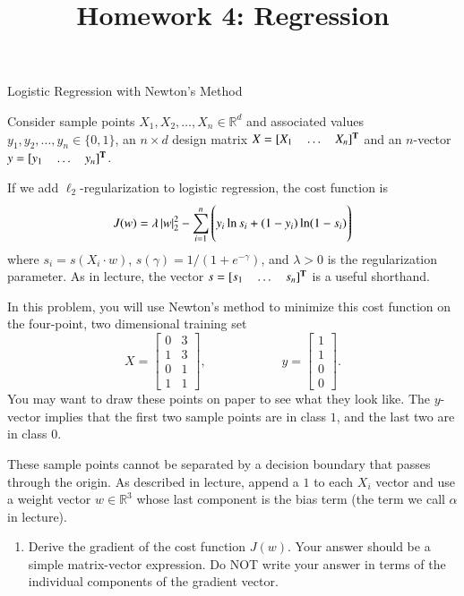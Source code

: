 \documentclass[section]{problemset}
\title{Homework 4: Regression}
\def\1{{\mathbf 1}}
\begin{document}
\newpage


\begin{problem}{Logistic Regression with Newton's Method}

Consider sample points $X_1, X_2, \ldots, X_n \in \mathbb{R}^d$ and
associated values $y_1, y_2, \ldots, y_n \in \{ 0, 1 \}$,
an $n \times d$ design matrix $X = [X_1~~~~\dots~~~~X_n]^{\mathbf{T}}$ and
an $n$-vector $y = [y_1~~~~\dots~~~~y_n]^{\mathbf{T}}$.

If we add $\ell_2$-regularization to logistic regression,
the cost function is
\[
J(w) = \lambda \, |w|^2_2 -
\sum_{i=1}^n \left(y_i \ln s_i + (1-y_i) \ln (1 - s_i) \rule{0pt}{18pt} \right)
\]
where $s_i = s(X_i \cdot w)$, $s(\gamma) = 1 / (1 + e^{- \gamma})$, and
$\lambda > 0$ is the regularization parameter.
As in lecture, the vector $s = [s_1~~~~\dots~~~~s_n]^{\mathbf{T}}$ is
a useful shorthand.

In this problem, you will use Newton's method to minimize this cost function
on the four-point, two dimensional training set
\[
X = \begin{bmatrix} 0 &3 \\ 1& 3\\ 0 &1\\ 1 &1 \end{bmatrix},
\hspace{1in}
y = \begin{bmatrix} 1\\1\\0\\0 \end{bmatrix}.
\]
You may want to draw these points on paper to see what they look like.
The $y$-vector implies that the first two sample points are in class $1$, and
the last two are in class $0$.

These sample points cannot be separated by a decision boundary that
passes through the origin.
As described in lecture, append a $1$ to each $X_i$ vector and
use a weight vector $w \in \mathbb{R}^3$ whose last component is
the bias term (the term we call $\alpha$ in lecture).

\begin{enumerate}
\item
Derive the gradient of the cost function $J(w)$.
Your answer should be a simple matrix-vector expression.
Do NOT write your answer in terms of the individual components of
the gradient vector.

\begin{comment}
\begin{mdframed}
\textbf{Initial verbose version}:


\end{comment}
\end{enumerate}
\end{problem}
\end{document}
